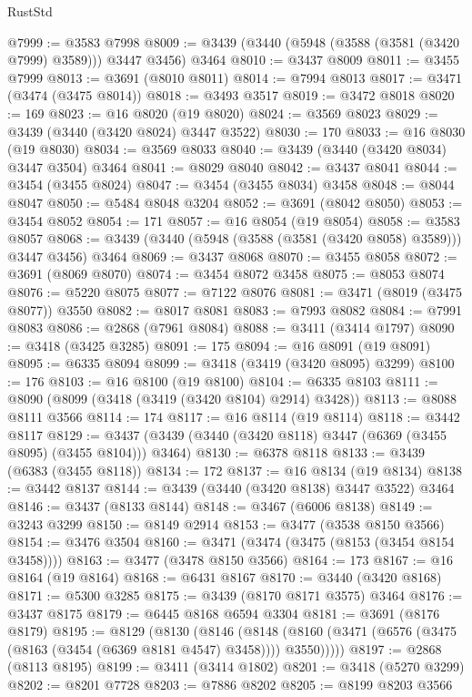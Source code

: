 \begin{lexlean}{RustStd}
\begin{coremodule}
{{{{{{{{{{{{{{{{{{{@7999 := @3583 @7998
@8009 := @3439 (@3440 (@5948 (@3588 (@3581 (@3420 @7999) @3589))) @3447 @3456) @3464
@8010 := @3437 @8009
@8011 := @3455 @7999
@8013 := @3691 (@8010 @8011)
@8014 := @7994 @8013
@8017 := @3471 (@3474 (@3475 @8014))
@8018 := @3493 @3517
@8019 := @3472 @8018
@8020 := 169
@8023 := @16 @8020 (@19 @8020)
@8024 := @3569 @8023
@8029 := @3439 (@3440 (@3420 @8024) @3447 @3522)
@8030 := 170
@8033 := @16 @8030 (@19 @8030)
@8034 := @3569 @8033
@8040 := @3439 (@3440 (@3420 @8034) @3447 @3504) @3464
@8041 := @8029 @8040
@8042 := @3437 @8041
@8044 := @3454 (@3455 @8024)
@8047 := @3454 (@3455 @8034) @3458
@8048 := @8044 @8047
@8050 := @5484 @8048 @3204
@8052 := @3691 (@8042 @8050)
@8053 := @3454 @8052
@8054 := 171
@8057 := @16 @8054 (@19 @8054)
@8058 := @3583 @8057
@8068 := @3439 (@3440 (@5948 (@3588 (@3581 (@3420 @8058) @3589))) @3447 @3456) @3464
@8069 := @3437 @8068
@8070 := @3455 @8058
@8072 := @3691 (@8069 @8070)
@8074 := @3454 @8072 @3458
@8075 := @8053 @8074
@8076 := @5220 @8075
@8077 := @7122 @8076
@8081 := @3471 (@8019 (@3475 @8077)) @3550
@8082 := @8017 @8081
@8083 := @7993 @8082
@8084 := @7991 @8083
@8086 := @2868 (@7961 @8084)
@8088 := @3411 (@3414 @1797)
@8090 := @3418 (@3425 @3285)
@8091 := 175
@8094 := @16 @8091 (@19 @8091)
@8095 := @6335 @8094
@8099 := @3418 (@3419 (@3420 @8095) @3299)
@8100 := 176
@8103 := @16 @8100 (@19 @8100)
@8104 := @6335 @8103
@8111 := @8090 (@8099 (@3418 (@3419 (@3420 @8104) @2914) @3428))
@8113 := @8088 @8111 @3566
@8114 := 174
@8117 := @16 @8114 (@19 @8114)
@8118 := @3442 @8117
@8129 := @3437 (@3439 (@3440 (@3420 @8118) @3447 (@6369 (@3455 @8095) (@3455 @8104))) @3464)
@8130 := @6378 @8118
@8133 := @3439 (@6383 (@3455 @8118))
@8134 := 172
@8137 := @16 @8134 (@19 @8134)
@8138 := @3442 @8137
@8144 := @3439 (@3440 (@3420 @8138) @3447 @3522) @3464
@8146 := @3437 (@8133 @8144)
@8148 := @3467 (@6006 @8138)
@8149 := @3243 @3299
@8150 := @8149 @2914
@8153 := @3477 (@3538 @8150 @3566)
@8154 := @3476 @3504
@8160 := @3471 (@3474 (@3475 (@8153 (@3454 @8154 @3458))))
@8163 := @3477 (@3478 @8150 @3566)
@8164 := 173
@8167 := @16 @8164 (@19 @8164)
@8168 := @6431 @8167
@8170 := @3440 (@3420 @8168)
@8171 := @5300 @3285
@8175 := @3439 (@8170 @8171 @3575) @3464
@8176 := @3437 @8175
@8179 := @6445 @8168 @6594 @3304
@8181 := @3691 (@8176 @8179)
@8195 := @8129
    (@8130
      (@8146
        (@8148 (@8160 (@3471 (@6576 (@3475 (@8163 (@3454 (@6369 @8181 @4547) @3458)))) @3550)))))
@8197 := @2868 (@8113 @8195)
@8199 := @3411 (@3414 @1802)
@8201 := @3418 (@5270 @3299)
@8202 := @8201 @7728
@8203 := @7886 @8202
@8205 := @8199 @8203 @3566
}}}}}}}}}}}}}}}}}}}
\end{coremodule}
\end{lexlean}
